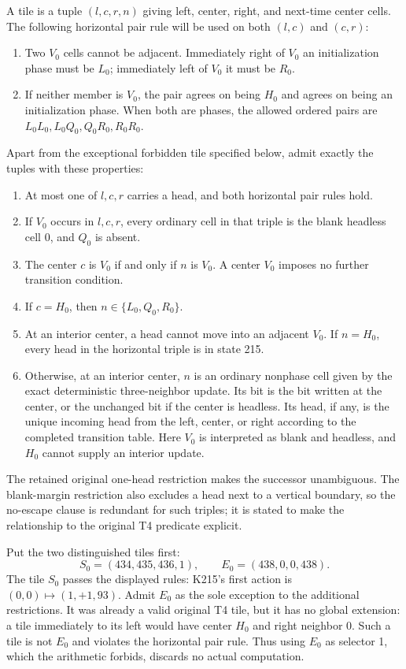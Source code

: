 A tile is a tuple $(l,c,r,n)$ giving left, center, right, and next-time
center cells.  The following horizontal pair rule will be used on both
$(l,c)$ and $(c,r)$:
\begin{enumerate}
\item Two $V_0$ cells cannot be adjacent.  Immediately right of $V_0$ an
initialization phase must be $L_0$; immediately left of $V_0$ it must be
$R_0$.
\item If neither member is $V_0$, the pair agrees on being $H_0$ and
agrees on being an initialization phase.  When both are phases, the
allowed ordered pairs are $L_0L_0,L_0Q_0,Q_0R_0,R_0R_0$.
\end{enumerate}
Apart from the exceptional forbidden tile specified below, admit exactly
the tuples with these properties:
\begin{enumerate}
\item At most one of $l,c,r$ carries a head, and both horizontal pair
rules hold.
\item If $V_0$ occurs in $l,c,r$, every ordinary cell in that triple is
the blank headless cell 0, and $Q_0$ is absent.
\item The center $c$ is $V_0$ if and only if $n$ is $V_0$.  A center
$V_0$ imposes no further transition condition.
\item If $c=H_0$, then $n\in\{L_0,Q_0,R_0\}$.
\item At an interior center, a head cannot move into an adjacent
$V_0$.  If $n=H_0$, every head in the horizontal triple is in state 215.
\item Otherwise, at an interior center, $n$ is an ordinary nonphase
cell given by the exact deterministic three-neighbor update.  Its bit
is the bit written at the center, or the unchanged bit if the center
is headless.  Its head, if any, is the unique incoming head from the
left, center, or right according to the completed transition table.
Here $V_0$ is interpreted as blank and headless, and $H_0$ cannot supply
an interior update.
\end{enumerate}
The retained original one-head restriction makes the successor unambiguous.
The blank-margin restriction also excludes a head next to a vertical
boundary, so the no-escape clause is redundant for such triples; it is
stated to make the relationship to the original T4 predicate explicit.

Put the two distinguished tiles first:
\begin{equation}
 S_0=(434,435,436,1),\qquad E_0=(438,0,0,438).
 \label{eq:compiler-distinguished}
\end{equation}
The tile $S_0$ passes the displayed rules: K215's first action is
$(0,0)\mapsto(1,+1,93)$.  Admit $E_0$ as the sole exception to the
additional restrictions.  It was already a valid original T4 tile, but
it has no global extension: a tile immediately to its left would have
center $H_0$ and right neighbor 0.  Such a tile is not $E_0$ and violates
the horizontal pair rule.  Thus using $E_0$ as selector 1, which the
arithmetic forbids, discards no actual computation.

